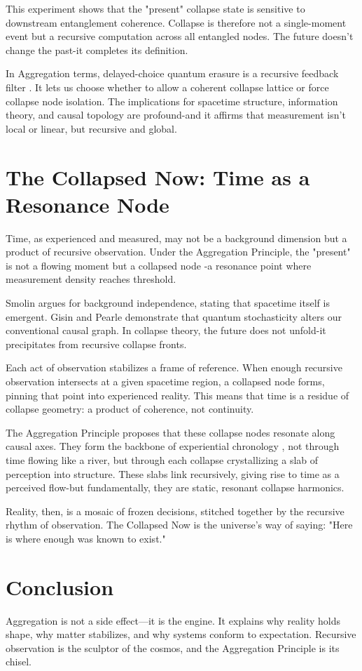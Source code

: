 This experiment shows that the "present" collapse state is sensitive to downstream entanglement coherence. Collapse is therefore not a single-moment event but a recursive computation across all entangled nodes. The future doesn’t change the past-it completes its definition.

In Aggregation terms, delayed-choice quantum erasure is a  recursive feedback filter . It lets us choose whether to allow a coherent collapse lattice or force collapse node isolation. The implications for spacetime structure, information theory, and causal topology are profound-and it affirms that measurement isn't local or linear, but recursive and global.

\section{The Collapsed Now: Time as a Resonance Node}

Time, as experienced and measured, may not be a background dimension but a product of recursive observation. Under the Aggregation Principle, the "present" is not a flowing moment but a  collapsed node -a resonance point where measurement density reaches threshold.

Smolin \cite{aggregation_decoherence_core} argues for background independence, stating that spacetime itself is emergent. Gisin \cite{aggregation_decoherence_core} and Pearle \cite{aggregation_decoherence_core} demonstrate that quantum stochasticity alters our conventional causal graph. In collapse theory, the future does not unfold-it precipitates from recursive collapse fronts.

Each act of observation stabilizes a frame of reference. When enough recursive observation intersects at a given spacetime region, a collapsed node forms, pinning that point into experienced reality. This means that time is a residue of collapse geometry: a product of coherence, not continuity.

The Aggregation Principle proposes that these collapse nodes resonate along causal axes. They form the  backbone of experiential chronology , not through time flowing like a river, but through each collapse crystallizing a slab of perception into structure. These slabs link recursively, giving rise to time as a perceived flow-but fundamentally, they are static, resonant collapse harmonics.

Reality, then, is a mosaic of frozen decisions, stitched together by the recursive rhythm of observation. The Collapsed Now is the universe's way of saying: "Here is where enough was known to exist."

\section{Conclusion}

Aggregation is not a side effect---it is the engine. It explains why reality holds shape, why matter stabilizes, and why systems conform to expectation. Recursive observation is the sculptor of the cosmos, and the Aggregation Principle is its chisel.

\nocite{*}
\printbibliography[title={Appendix D References}, keyword=chapter4]
